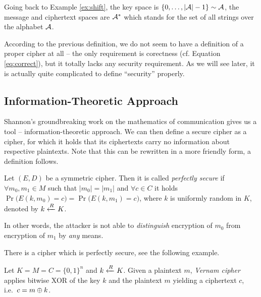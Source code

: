 \begin{note}
	Going back to Example \ref{ex:shift}, the key space is $\{0 , \ldots , |{\cal A}|-1\}\sim\cal A$, the message and ciphertext spaces are ${\cal A}^*$ which stands for the set of all strings over the alphabet $\cal A$.
\end{note}

According to the previous definition, we do not seem to have a definition of a proper cipher at all -- the only requirement is corectness (cf. Equation \ref{eq:correct}), but it totally lacks any security requirement. As we will see later, it is actually quite complicated to define ``security'' properly.



\subsection{Information-Theoretic Approach}

Shannon's groundbreaking work \cite{shannon1949mathematical} on the mathematics of communication gives us a tool -- information-theoretic approach. We can then define a secure cipher as a cipher, for which it holds that its ciphertexts carry no information about respective plaintexts. Note that this can be rewritten in a more friendly form, a definition follows.

\begin{defn}
\label{def:perfsec}
	Let $(E,D)$ be a symmetric cipher. Then it is called {\em perfectly secure} if $\forall m_0,m_1\in M$ such that $|m_0| = |m_1|$ and $\forall c\in C$ it holds $\Pr\bigl(E(k,m_0)=c\bigr) = \Pr\bigl(E(k,m_1)=c\bigr)$, where $k$ is uniformly random in $K$, denoted by $k\xleftarrow{R} K$.
\end{defn}

\begin{note}
\label{note:indist}
	In other words, the attacker is not able to {\em distinguish} encryption of $m_0$ from encryption of $m_1$ by {\em any} means.
\end{note}

There is a cipher which is perfectly secure, see the following example.

\begin{example}
	Let $K = M = C = \{0,1\}^n$ and $k\xleftarrow{R} K$. Given a plaintext $m$, {\em Vernam cipher} applies bitwise XOR of the key $k$ and the plaintext $m$ yielding a ciphertext $c$, i.e.\ $c = m\oplus k$.
\end{example}

